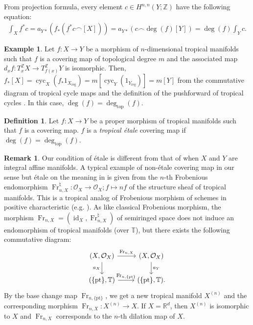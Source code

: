 \documentclass[a4paper,dvipdfmx,reqno,12pt]{amsart}
\theoremstyle{definition}
\newtheorem{definition}[theorem]{Definition}
\newtheorem{example}[theorem]{Example}
\newtheorem{remark}[theorem]{Remark}
\newcommand{\opn}[1]{\operatorname{#1}}
\numberwithin{equation}{section}
\begin{document}
From projection formula, every element 
$c\in H^{n,n}(Y;\mathbb{Z})$ have the following equation:
\begin{align}
\int_{X}f^{*}c
=a_{Y*}(f_*(f^{*}c\frown [X]))
=a_{Y*}(c\frown \opn{deg}(f)[Y])
=\opn{deg}(f)\int_Y c.
\end{align}

\begin{example}
Let $f\colon X\to Y$ be a morphism of 
$n$-dimensional tropical manifolds such that $f$ is a 
covering map of topological degree $m$ and the associated map $d_xf\colon 
T_{x}^{\mathbb{Z}} X\to T_{f(x)}^{\mathbb{Z}}Y$ is 
isomorphic.
Then, $f_*[X]=\opn{cyc}_X(f_*1_{X_{\mathrm{reg}}})
=m[\opn{cyc}_Y(1_{Y_{\mathrm{reg}}})]=m
[Y]$ from the commutative diagram of
tropical cycle maps and the definition of the pushforward
of tropical cycles \cite[Definition 3.6]{gross2019sheaftheoretic}.
In this case, $\opn{deg}(f)=\opn{deg}_{\mathrm{top}}(f)$.
\end{example}

\begin{definition} \label{definition-etale-covering}
Let $f\colon X\to Y$ be a proper morphism 
of tropical manifolds such
that $f$ is a covering map.
$f$ is a \emph{tropical \'etale} covering map 
if $\opn{deg}(f)=\opn{deg}_{\mathrm{top}}(f)$.  
\end{definition}
\begin{remark}
Our condition of \'etale is different from that of 
\cite[Definition 1.1]{grossMirrorSymmetryLogarithmic2006a}
when $X$ and $Y$ are integral affine manifolds.
A typical example of non-\'etale covering map 
in our sense but \'etale on the meaning in 
\cite{grossMirrorSymmetryLogarithmic2006a} is given
from the $n$-th Frobenious endomorphism 
$\opn{Fr}_{n,X}^{\natural}\colon \mathcal{O}_X \to \mathcal{O}_X; f\mapsto nf$ of 
the structure sheaf of tropical manifolds. 
This is a tropical analog of Frobenious morphism of 
schemes in positive characteristic 
(e.g. \cite[IV. Remark 2.4.1]{hartshorneAlgebraicGeometry1977a}). As like classical Frobenious morphism, 
the morphism $\opn{Fr}_{n,X}=(\opn{id}_X,\opn{Fr}_{n,X}^{\natural})$ of semiringed space does 
not induce an endomorphism of tropical manifolds 
(over $\mathbb{T}$), but
there exists the following commutative diagram:
\begin{equation}
\begin{tikzcd}
 (X,\mathcal{O}_X) \arrow[r,"{\opn{Fr}_{n,X}}"] 
\arrow[d,"{a_X}"']
 &   (X,\mathcal{O}_X) \arrow[d,"{a_Y}"] \\
(\{\opn{pt}\},\mathbb{T})
\arrow[r,"{\opn{Fr}_{n,\{\opn{pt}\}}}"]
 & (\{\opn{pt}\},\mathbb{T}).
\end{tikzcd}
\end{equation}
By the base change map $\opn{Fr}_{n,\{\mathrm{pt}\}}$, we get 
a new tropical manifold $X^{(n)}$
and the corresponding morphism 
$\opn{Fr}_{n,X}\colon X^{(n)}\to X$. 
If $X=\mathbb{R}^{d}$, then $X^{(n)}$ is 
isomorphic to $X$ and 
$\opn{Fr}_{n,X}$ corresponds to 
the $n$-th dilation map of $X$.
\end{remark}
\end{document}
